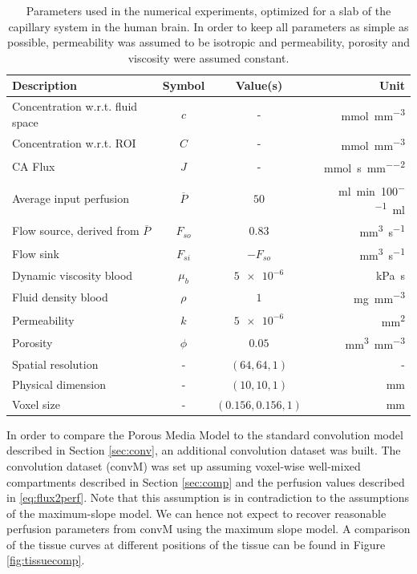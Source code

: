 \documentclass[paper=a4, fontsize=11pt,parskip=half,headings=small]{scrartcl}
\newcommand{\siJ}{\milli\mol\per\second\per\square\milli\meter}
\newcommand{\sic}{\milli\mol\per\cubic\milli\meter}
\newcommand{\siPn}{\milli\litre\per\minute\per100\milli\litre}
\begin{document}
	\begin{table}[H]
		\centering
	  \caption{Parameters used in the numerical experiments, optimized for a slab of the capillary system in the human brain. In order to keep all parameters as simple as possible, permeability was assumed to be isotropic and permeability, porosity and viscosity were assumed constant.}		
		\begin{tabular}{ l  c  c  r }
		    Description 									& Symbol 			& Value(s) 				& Unit 				\\
			\toprule
			Concentration w.r.t. fluid space				& $c$				& - 					& \si{\sic} 		\\
			Concentration w.r.t. ROI						& $C$				& - 					& \si{\sic} 		\\
			CA Flux											& $J$				& - 					& \si{\siJ} 		\\
		    Average input perfusion 				 		& $\overline{P}$ 	& $50$ 					& \si{\siPn}		\\
			Flow source, derived from $\overline{P}$ 		& $F_{so}$ 			& \num{0.83}			& \si{\cubic\milli\meter\per\second} \\
			Flow sink 										& $F_{si}$ 			& $-F_{so}$ 		 	& \si{\cubic\milli\meter\per\second}  		\\
			Dynamic viscosity blood \cite{rosencranz06} 	& $\mu_b$ 			& $\num{5e-6}$ 			& \si{\kilo\pascal\second}  	\\
			Fluid density blood \cite{kenner89} 			& $\rho$ 			& $\num{1}$				& \si{\milli\gram\per\cubic\milli\meter} 		\\		
			Permeability  									& $k$ 				& $\num{5e-6}$ 			& \si{\square\milli\meter} 			\\	
			Porosity\cite{wu03}								& $\phi$ 			& $0.05$ 				& \si{\cubic\milli\meter\per\cubic\milli\meter}	\\	
			Spatial resolution 								& - 				& $(64,64,1)$ 			& -					\\
			Physical dimension 								& - 				& $(10,10,1)$ 			& \si{\milli\meter}				\\
			Voxel size 										& - 				& $(0.156,0.156,1)$ 	& \si{\milli\meter}	\\
	  \end{tabular}
	  \label{tab:par}
	\end{table}	
	
	In order to compare the Porous Media Model to the standard convolution model described in Section \ref{sec:conv}, an additional convolution dataset was built.
	The convolution dataset (convM) was set up assuming voxel-wise well-mixed compartments described in Section \ref{sec:comp} and the perfusion values described in \eqref{eq:flux2perf}.
	Note that this assumption is in contradiction to the assumptions of the maximum-slope model.
	We can hence not expect to recover reasonable perfusion parameters from convM using the maximum slope model.
	A comparison of the tissue curves at different positions of the tissue can be found in Figure \ref{fig:tissuecomp}. 
\end{document}
